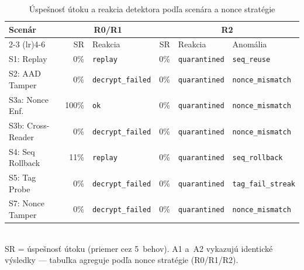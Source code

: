 \begin{table}[H]
\centering
\caption{Úspešnosť útoku a reakcia detektora podľa scenára a nonce stratégie}
\label{tab:scenario-summary}
\small
\begin{tabular}{l r l r l l}
\toprule
Scenár & \multicolumn{2}{c}{R0/R1} & \multicolumn{3}{c}{R2} \\
\cmidrule(lr){2-3} \cmidrule(lr){4-6}
 & SR & Reakcia & SR & Reakcia & Anomália \\
\midrule
S1: Replay            & 0\%   & \texttt{replay}           & 0\%  & \texttt{quarantined} & \texttt{seq\_reuse} \\
S2: AAD Tamper        & 0\%   & \texttt{decrypt\_failed}  & 0\%  & \texttt{quarantined} & \texttt{nonce\_mismatch} \\
S3a: Nonce Enf.       & 100\% & \texttt{ok}               & 0\%  & \texttt{quarantined} & \texttt{nonce\_mismatch} \\
S3b: Cross-Reader     & 0\%   & \texttt{decrypt\_failed}  & 0\%  & \texttt{quarantined} & \texttt{nonce\_mismatch} \\
S4: Seq Rollback      & 11\%  & \texttt{replay}           & 0\%  & \texttt{quarantined} & \texttt{seq\_rollback} \\
S5: Tag Probe         & 0\%   & \texttt{decrypt\_failed}  & 0\%  & \texttt{quarantined} & \texttt{tag\_fail\_streak} \\
S7: Nonce Tamper      & 0\%   & \texttt{decrypt\_failed}  & 0\%  & \texttt{quarantined} & \texttt{nonce\_mismatch} \\
\bottomrule
\end{tabular}
\\[4pt]
\footnotesize SR = úspešnosť útoku (priemer cez 5~behov). A1 a~A2 vykazujú identické výsledky --- tabuľka agreguje podľa nonce stratégie (R0/R1/R2).
\end{table}
